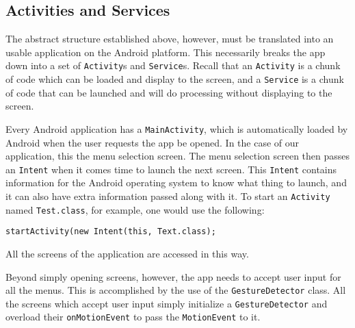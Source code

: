 \subsection{Activities and Services}

The abstract structure established above, however, must be translated into an usable application on the Android platform. This necessarily 
breaks the app down into a set of \verb|Activity|s and \verb|Service|s. Recall that an \verb|Activity| is a chunk of code which can be loaded
and display to the screen, and a \verb|Service| is a chunk of code that can be launched and will do processing without displaying to the 
screen.

Every Android application has a \verb|MainActivity|, which is automatically loaded by Android when the user requests the app be opened. 
In the case of our application, this the menu selection screen. The menu selection screen then passes an \verb|Intent| when it comes time to launch the next screen.
This \verb|Intent| contains information for the Android operating system to know what thing to launch, and it can also have extra information passed along with it.
To start an \verb|Activity| named \verb|Test.class|, for example, one would use the following:
\begin{verbatim}
startActivity(new Intent(this, Text.class);
\end{verbatim}
All the screens of the application are accessed in this way.

Beyond simply opening screens, however, the app needs to accept user input for all the menus. This is accomplished by the use of the \verb|GestureDetector| class.
All the screens which accept user input simply initialize a \verb|GestureDetector| and overload their \verb|onMotionEvent| to pass the \verb|MotionEvent| to it.

